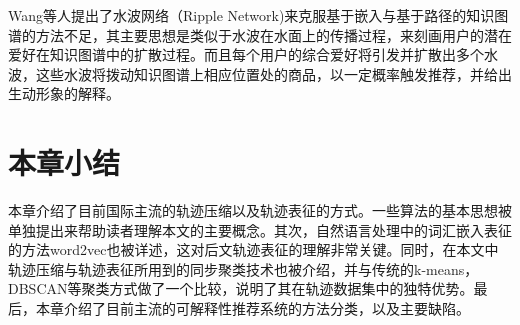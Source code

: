 Wang等人\cite{wang2018ripple}提出了水波网络（Ripple Network)来克服基于嵌入与基于路径的知识图谱的方法不足，其主要思想是类似于水波在水面上的传播过程，来刻画用户的潜在爱好在知识图谱中的扩散过程。而且每个用户的综合爱好将引发并扩散出多个水波，这些水波将拨动知识图谱上相应位置处的商品，以一定概率触发推荐，并给出生动形象的解释。

\section{本章小结}
本章介绍了目前国际主流的轨迹压缩以及轨迹表征的方式。一些算法的基本思想被单独提出来帮助读者理解本文的主要概念。其次，自然语言处理中的词汇嵌入表征的方法word2vec也被详述，这对后文轨迹表征的理解非常关键。同时，在本文中轨迹压缩与轨迹表征所用到的同步聚类技术也被介绍，并与传统的k-means，DBSCAN等聚类方式做了一个比较，说明了其在轨迹数据集中的独特优势。最后，本章介绍了目前主流的可解释性推荐系统的方法分类，以及主要缺陷。

\newpage\mbox{}\thispagestyle{empty}\newpage
